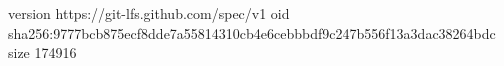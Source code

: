 version https://git-lfs.github.com/spec/v1
oid sha256:9777bcb875ecf8dde7a55814310cb4e6cebbbdf9c247b556f13a3dac38264bdc
size 174916
